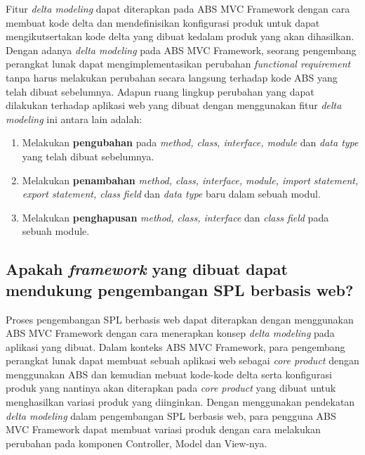 Fitur \textit{delta modeling} dapat diterapkan pada ABS MVC Framework dengan cara membuat kode delta dan mendefinisikan konfigurasi produk untuk dapat mengikutsertakan kode delta yang dibuat kedalam produk yang akan dihasilkan. Dengan adanya \textit{delta modeling} pada ABS MVC Framework, seorang pengembang perangkat lunak dapat mengimplementasikan perubahan \textit{functional requirement} tanpa harus melakukan perubahan secara langsung terhadap kode ABS yang telah dibuat sebelumnya. Adapun ruang lingkup perubahan yang dapat dilakukan terhadap aplikasi web yang dibuat dengan menggunakan fitur \textit{delta modeling} ini antara lain adalah:

\begin{enumerate}
    \item Melakukan \textbf{pengubahan} pada \textit{method, class, interface, module} dan \textit{data type} yang telah dibuat sebelumnya.
    \item Melakukan \textbf{penambahan} \textit{method, class, interface, module, import statement, export statement, class field} dan \textit{data type} baru dalam sebuah modul.
    \item Melakukan \textbf{penghapusan} \textit{method, class, interface} dan \textit{class field} pada sebuah module.
\end{enumerate}

\subsection{Apakah \textit{framework} yang dibuat dapat mendukung pengembangan SPL berbasis web?}

Proses pengembangan SPL berbasis web dapat diterapkan dengan menggunakan ABS MVC Framework dengan cara menerapkan konsep \textit{delta modeling} pada aplikasi yang dibuat. Dalam konteks ABS MVC Framework, para pengembang perangkat lunak dapat membuat sebuah aplikasi web sebagai \textit{core product} dengan menggunakan ABS dan kemudian mebuat kode-kode delta serta konfigurasi produk yang nantinya akan diterapkan pada \textit{core product} yang dibuat untuk menghasilkan variasi produk yang diinginkan. Dengan menggunakan pendekatan \textit{delta modeling} dalam pengembangan SPL berbasis web, para pengguna ABS MVC Framework dapat membuat variasi produk dengan cara melakukan perubahan pada komponen Controller, Model dan View-nya.\\

